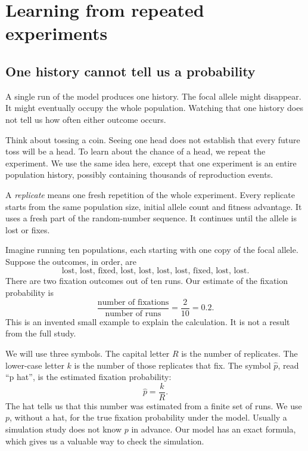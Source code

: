 \chapter{Learning from repeated experiments}
\label{ch:repetitions}

\section{One history cannot tell us a probability}

A single run of the model produces one history. The focal allele might disappear. It might eventually occupy the whole population. Watching that one history does not tell us how often either outcome occurs.

Think about tossing a coin. Seeing one head does not establish that every future toss will be a head. To learn about the chance of a head, we repeat the experiment. We use the same idea here, except that one experiment is an entire population history, possibly containing thousands of reproduction events.

A \emph{replicate} means one fresh repetition of the whole experiment. Every replicate starts from the same population size, initial allele count and fitness advantage. It uses a fresh part of the random-number sequence. It continues until the allele is lost or fixes.

\begin{workedexample}
Imagine running ten populations, each starting with one copy of the focal allele. Suppose the outcomes, in order, are
\[
\text{lost, lost, fixed, lost, lost, lost, lost, fixed, lost, lost}.
\]
There are two fixation outcomes out of ten runs. Our estimate of the fixation probability is
\[
\frac{\text{number of fixations}}{\text{number of runs}}
=\frac{2}{10}=0.2.
\]
This is an invented small example to explain the calculation. It is not a result from the full study.
\end{workedexample}

We will use three symbols. The capital letter $R$ is the number of replicates. The lower-case letter $k$ is the number of those replicates that fix. The symbol $\widehat p$, read ``p hat'', is the estimated fixation probability:
\begin{equation}
\widehat p=\frac{k}{R}.
\label{eq:estimated-probability}
\end{equation}
The hat tells us that this number was estimated from a finite set of runs. We use $p$, without a hat, for the true fixation probability under the model. Usually a simulation study does not know $p$ in advance. Our model has an exact formula, which gives us a valuable way to check the simulation.

